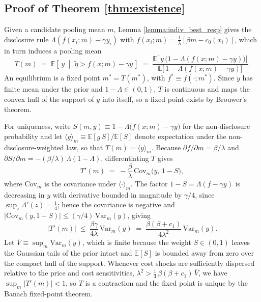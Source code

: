 \documentclass[a4paper,12pt]{article}
\begin{document}
\subsection{Proof of Theorem \ref{thm:existence}}

Given a candidate pooling mean $m$, Lemma \ref{lemma:indiv_best_resp} gives the disclosure rule $\Lambda(f(x_i; m) - \gamma y_i)$ with $f(x_i; m) = \tfrac{1}{\lambda}[\beta m - c_0(x_i)]$, which in turn induces a pooling mean
\begin{equation*}
    T(m) \;=\; \mathbb{E}\!\left[\, y \;\middle|\; \tilde{\eta} > f(x; m) - \gamma y \,\right]
    \;=\; \frac{\mathbb{E}\big[\, y\,\big(1-\Lambda(f(x;m)-\gamma y)\big)\big]}{\mathbb{E}\big[\,1-\Lambda(f(x;m)-\gamma y)\big]}.
\end{equation*}
An equilibrium is a fixed point $m^* = T(m^*)$, with $f^* \equiv f(\cdot; m^*)$. Since $y$ has finite mean under the prior and $1-\Lambda \in (0,1)$, $T$ is continuous and maps the convex hull of the support of $y$ into itself, so a fixed point exists by Brouwer's theorem.

For uniqueness, write $S(m,y) \equiv 1-\Lambda\big(f(x;m)-\gamma y\big)$ for the non-disclosure probability and let $\langle g \rangle_m \equiv \mathbb{E}[g\,S]/\mathbb{E}[S]$ denote expectation under the non-disclosure-weighted law, so that $T(m) = \langle y \rangle_m$. Because $\partial f/\partial m = \beta/\lambda$ and $\partial S/\partial m = -(\beta/\lambda)\,\Lambda(1-\Lambda)$, differentiating $T$ gives
\begin{equation*}
    T'(m) \;=\; -\frac{\beta}{\lambda}\,\mathrm{Cov}_m\!\big(y,\,1-S\big),
\end{equation*}
where $\mathrm{Cov}_m$ is the covariance under $\langle\cdot\rangle_m$. The factor $1-S = \Lambda(f-\gamma y)$ is decreasing in $y$ with derivative bounded in magnitude by $\gamma/4$, since $\sup_z \Lambda'(z) = \tfrac14$; hence the covariance is negative and $|\mathrm{Cov}_m(y,1-S)| \le (\gamma/4)\,\mathrm{Var}_m(y)$, giving
\begin{equation*}
    \big|T'(m)\big| \;\le\; \frac{\beta\gamma}{4\lambda}\,\mathrm{Var}_m(y) \;=\; \frac{\beta(\beta+c_1)}{4\lambda^2}\,\mathrm{Var}_m(y).
\end{equation*}
Let $\bar V \equiv \sup_m \mathrm{Var}_m(y)$, which is finite because the weight $S \in (0,1)$ leaves the Gaussian tails of the prior intact and $\mathbb{E}[S]$ is bounded away from zero over the compact hull of the support. Whenever cost shocks are sufficiently dispersed relative to the price and cost sensitivities, $\lambda^2 > \tfrac14\,\beta(\beta+c_1)\,\bar V$, we have $\sup_m |T'(m)| < 1$, so $T$ is a contraction and the fixed point is unique by the Banach fixed-point theorem.
\end{document}

